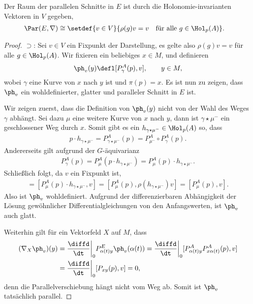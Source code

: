 \documentclass[%
	paper=a5,%
	fleqn,%
	DIV=18,%
	BCOR=0mm,
	fontsize=11pt,
	titlepage=false,%
	bibliography=totoc,
	DIV=18,%
	twoside=true,
	pdftitle=Riemannsche Geometrie,
	pdfauthor=Uwe Semmelmann,
	numbers=noendperiod]%
	{scrbook}
\begin{document}
\begin{prop}
Der Raum der parallelen Schnitte in $E$ ist durch die Holonomie-invarianten Vektoren in $V$ gegeben,
\begin{align*}
\Par(E,\nabla) &\cong \setdef{v\in V}{\rho(g)v = v\quad \text{für alle }g\in \Hol_{p}(A)}.
\end{align*}
\end{prop}
\begin{proof}
$\supset$:
Sei $v\in V$ ein Fixpunkt der Darstellung, es gelte also $\rho(g)v=v$ für alle $g\in \Hol_{p}(A)$. Wir fixieren ein beliebiges $x\in M$, und definieren
\begin{align*}
\ph_{v}(y) \defl [P_{\gamma}^A(p),v],\qquad y\in M,
\end{align*}
wobei $\gamma$ eine Kurve von $x$ nach $y$ ist und $\pi(p)=x$. Es ist nun zu zeigen, dass $\ph_{v}$ ein wohldefinierter, glatter und paralleler Schnitt in $E$ ist.

Wir zeigen zuerst, dass die Definition von $\ph_{v}(y)$ nicht von der Wahl des Weges $\gamma$ abhängt. Sei dazu $\mu$ eine weitere Kurve von $x$ nach $y$, dann ist $\gamma\star \mu^-$ ein geschlossener Weg durch $x$.
Somit gibt es ein $h_{\gamma\star \mu^-}\in \Hol_{p}(A)$ so, dass 
\begin{align*}
p\cdot h_{\gamma\star \mu^-} = P_{\gamma\star \mu^-}^A(p) = P_{\mu^-}^A\circ P_{\gamma}^A(p).
\end{align*}
Andererseits gilt aufgrund der $G$-äquivarianz
\begin{align*}
P_{\gamma}^A(p) =P_{\mu}^A(p\cdot h_{\gamma\star \mu^-}) =  P_{\mu}^A(p)\cdot h_{\gamma\star \mu^-}.
\end{align*}
Schließlich folgt, da $v$ ein Fixpunkt ist,
\begin{align*}
[P_{\gamma}^A(p),v] = [P_{\mu}^A(p)\cdot h_{\gamma\star \mu^-},v] = 
[P_{\mu}^A(p),\rho(h_{\gamma\star \mu^-})v] = 
[P_{\mu}^A(p),v].
\end{align*}
Also ist $\ph_{v}$ wohldefiniert. Aufgrund der differenzierbaren Abhängigkeit der Lösung gewöhnlicher Differentialgleichungen von den Anfangswerten, ist $\ph_{v}$ auch glatt.

Weiterhin gilt für ein Vektorfeld $X$ auf $M$, dass
\begin{align*}
(\nabla_{X}\ph_{v})(y) &= \frac{\diffd}{\dt}\bigg|_{0} P_{\alpha(t)y}^E\ph_{v}(\alpha(t))
= \frac{\diffd}{\dt}\bigg|_{0} [P_{\alpha(t)y}^AP^A_{x\alpha(t)}(p),v]\\
&= \frac{\diffd}{\dt}\bigg|_{0} [P_{xy}(p),v] = 0,
\end{align*}
denn die Parallelverschiebung hängt nicht vom Weg ab.
Somit ist $\ph_{v}$ tatsächlich parallel.


\end{proof}
\end{document}
